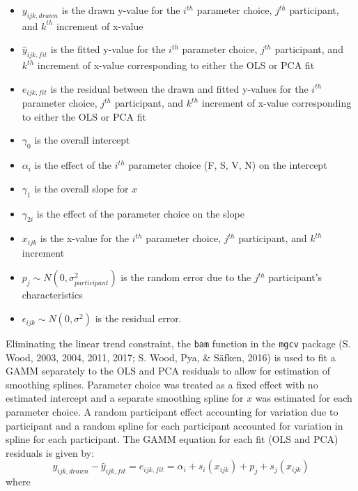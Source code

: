 \documentclass[print]{nuthesis}
\providecommand{\tightlist}{%
  \setlength{\itemsep}{0pt}\setlength{\parskip}{0pt}}
\begin{document}
\begin{itemize}
\tightlist
\item
  \(y_{ijk,drawn}\) is the drawn y-value for the \(i^{th}\) parameter choice, \(j^{th}\) participant, and \(k^{th}\) increment of x-value
\item
  \(\hat y_{ijk,fit}\) is the fitted y-value for the \(i^{th}\) parameter choice, \(j^{th}\) participant, and \(k^{th}\) increment of x-value corresponding to either the OLS or PCA fit
\item
  \(e_{ijk,fit}\) is the residual between the drawn and fitted y-values for the \(i^{th}\) parameter choice, \(j^{th}\) participant, and \(k^{th}\) increment of x-value corresponding to either the OLS or PCA fit
\item
  \(\gamma_0\) is the overall intercept
\item
  \(\alpha_i\) is the effect of the \(i^{th}\) parameter choice (F, S, V, N) on the intercept
\item
  \(\gamma_1\) is the overall slope for \(x\)
\item
  \(\gamma_{2i}\) is the effect of the parameter choice on the slope
\item
  \(x_{ijk}\) is the x-value for the \(i^{th}\) parameter choice, \(j^{th}\) participant, and \(k^{th}\) increment
\item
  \(p_{j} \sim N(0, \sigma^2_{participant})\) is the random error due to the \(j^{th}\) participant's characteristics
\item
  \(\epsilon_{ijk} \sim N(0, \sigma^2)\) is the residual error.
\end{itemize}

Eliminating the linear trend constraint, the \texttt{bam} function in the \texttt{mgcv} package (S. Wood, 2003, 2004, 2011, 2017; S. Wood, Pya, \& Säfken, 2016) is used to fit a GAMM separately to the OLS and PCA residuals to allow for estimation of smoothing splines.
Parameter choice was treated as a fixed effect with no estimated intercept and a separate smoothing spline for \(x\) was estimated for each parameter choice.
A random participant effect accounting for variation due to participant and a random spline for each participant accounted for variation in spline for each participant.
The GAMM equation for each fit (OLS and PCA) residuals is given by:
\begin{equation}
y_{ijk, drawn} - \hat y_{ijk, fit} = e_{ijk,fit} = \alpha_i + s_{i}(x_{ijk}) + p_{j} + s_{j}(x_{ijk})
\end{equation}
\noindent where
\end{document}
